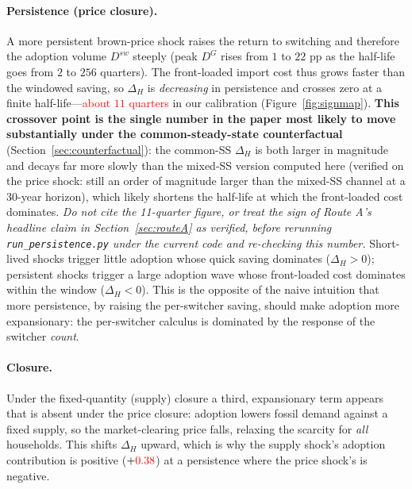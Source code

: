 \documentclass[11pt,a4paper]{article}
\newcommand{\NEEDSRERUN}[1]{\textcolor{red}{#1}}
\begin{document}
\paragraph{Persistence (price closure).} A more persistent brown-price shock
raises the return to switching and therefore the adoption volume $D^{sw}$
steeply (peak $D^{G}$ rises from $1$ to $22$ pp as the half-life goes from $2$
to $256$ quarters). The front-loaded import cost thus grows faster than the
windowed saving, so $\Delta_H$ is \emph{decreasing} in persistence and crosses
zero at a finite half-life---\NEEDSRERUN{about $11$ quarters} in our calibration
(Figure~\ref{fig:signmap}). \textbf{This crossover point is the single number in
the paper most likely to move substantially under the common-steady-state
counterfactual} (Section~\ref{sec:counterfactual}): the common-SS $\Delta_H$ is
both larger in magnitude and decays far more slowly than the mixed-SS version
computed here (verified on the price shock: still an order of magnitude larger
than the mixed-SS channel at a 30-year horizon), which likely shortens the
half-life at which the front-loaded cost dominates. \emph{Do not cite the
11-quarter figure, or treat the sign of Route A's headline claim in
Section~\ref{sec:routeA} as verified, before rerunning
\texttt{run\_persistence.py} under the current code and re-checking this
number.} Short-lived shocks trigger little adoption whose
quick saving dominates ($\Delta_H>0$); persistent shocks trigger a large
adoption wave whose front-loaded cost dominates within the window
($\Delta_H<0$). This is the opposite of the naive intuition that more
persistence, by raising the per-switcher saving, should make adoption more
expansionary: the per-switcher calculus is dominated by the response of the
switcher \emph{count}.

\paragraph{Closure.} Under the fixed-quantity (supply) closure a third,
expansionary term appears that is absent under the price closure: adoption
lowers fossil demand against a fixed supply, so the market-clearing price
falls, relaxing the scarcity for \emph{all} households. This shifts $\Delta_H$
upward, which is why the supply shock's adoption contribution is positive
($+\NEEDSRERUN{0.38}$) at a persistence where the price shock's is negative.
\end{document}
